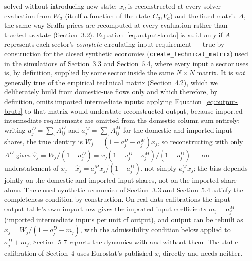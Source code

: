\documentclass[11pt]{article}
\begin{document}
solved without introducing new state: $x_d$ is reconstructed at every
solver evaluation from $W_d$ (itself a function of the state
$C_d,V_d$) and the fixed matrix $A$, the same way Sraffa prices are
recomputed at every evaluation rather than tracked as state
(Section~3.2). Equation~\eqref{eq:output-bruto} is valid only if $A$
represents each sector's \emph{complete} circulating-input requirement
--- true by construction for the closed synthetic economies
(\texttt{create\_technical\_matrix}) used in the simulations of
Section~3.3 and Section~5.4, where every input a sector uses is, by
definition, supplied by some sector inside the same $N\times N$ matrix.
It is \emph{not} generally true of the empirical technical matrix
(Section~4.2), which we deliberately build from domestic-use flows only
and which therefore, by definition, omits imported intermediate inputs;
applying Equation~\eqref{eq:output-bruto} to that matrix would
understate reconstructed output, because imported intermediate
requirements are omitted from the domestic column sum entirely; writing
$a_j^D=\sum_iA^D_{ij}$ and $a_j^M=\sum_iA^M_{ij}$ for the domestic and
imported input shares, the true identity is
$W_j=(1-a_j^D-a_j^M)x_j$, so reconstructing with only $A^D$ gives
$\hat x_j=W_j/(1-a_j^D)=x_j(1-a_j^D-a_j^M)/(1-a_j^D)$ --- an
understatement of $x_j-\hat x_j=a_j^M x_j/(1-a_j^D)$, not simply
$a_j^Mx_j$; the bias depends jointly on the domestic and imported input
shares, not on the imported share alone. The closed synthetic economies
of Section~3.3 and Section~5.4 satisfy the completeness condition by
construction. On real-data calibrations the input-output table's own
import row gives the imported input coefficients $m_j=a_j^M$ (imported
intermediate inputs per unit of output), and output can be rebuilt as
$x_j=W_j/(1-a_j^D-m_j)$, with the admissibility condition below applied
to $a_j^D+m_j$; Section~5.7 reports the dynamics with and without them.
The static calibration of Section~4 uses Eurostat's published $x_i$
directly and needs neither.
\end{document}
